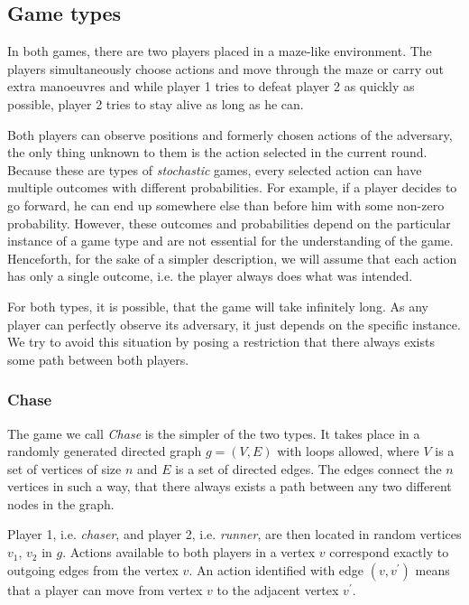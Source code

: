 \documentclass[../main.tex]{subfiles}
\begin{document}
\subsection{Game types}\label{exp:sg:games}
In both games, there are two players placed in a maze-like environment.
The players simultaneously choose actions and move through the maze or carry out extra manoeuvres and while player 1 tries to defeat player 2 as quickly as possible, player 2 tries to stay alive as long as he can.

Both players can observe positions and formerly chosen actions of the adversary, the only thing unknown to them is the action selected in the current round.
Because these are types of \textit{stochastic} games, every selected action can have multiple outcomes with different probabilities.
For example, if a player decides to go forward, he can end up somewhere else than before him with some non-zero probability.
However, these outcomes and probabilities depend on the particular instance of a game type and are not essential for the understanding of the game.
Henceforth, for the sake of a simpler description, we will assume that each action has only a single outcome, i.e. the player always does what was intended.

For both types, it is possible, that the game will take infinitely long.
As any player can perfectly observe its adversary, it just depends on the specific instance.
We try to avoid this situation by posing a restriction that there always exists some path between both players.

\subsubsection{Chase}\label{exp:sg:games:chase}
The game we call \textit{Chase} is the simpler of the two types.
It takes place in a randomly generated directed graph $g = (V, E)$ with loops allowed, where $V$ is a set of vertices of size $n$ and $E$ is a set of directed edges.
The edges connect the $n$ vertices in such a way, that there always exists a path between any two different nodes in the graph.

Player 1, i.e. \textit{chaser}, and player 2, i.e. \textit{runner}, are then located in random vertices $v_1$, $v_2$ in $g$.
Actions available to both players in a vertex $v$ correspond exactly to outgoing edges from the vertex $v$.
An action identified with edge $\left(v,v^{\prime}\right)$ means that a player can move from vertex $v$ to the adjacent vertex $v^{\prime}$.
\end{document}
